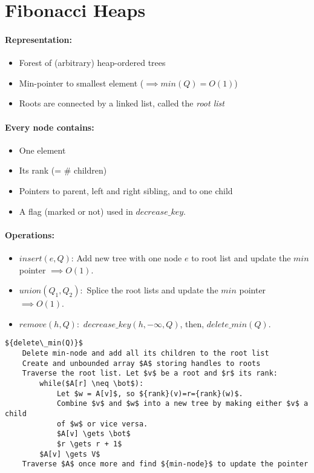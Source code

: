 \newpage \section{Fibonacci Heaps}

\paragraph{Representation:}

\begin{itemize}
\item Forest of (arbitrary) heap-ordered trees
\item Min-pointer to smallest element ($\implies {min}(Q) = O(1)$)
\item Roots are connected by a linked list, called the \emph{root list}
\end{itemize}

\paragraph{Every node contains:}

\begin{itemize}
\item One element
\item Its rank (= \# children)
\item Pointers to parent, left and right sibling, and to one child
\item A flag (marked or not) used in ${decrease\_key}$.
\end{itemize}

\paragraph{Operations:}

\begin{itemize}
\item ${insert}(e,Q)$: Add new tree with one node $e$ to root list and update the ${min}$ pointer $\implies O(1)$.
\item ${union}(Q_1, Q_2):$ Splice the root lists and update the ${min}$ pointer $\implies O(1)$.
\item ${remove}(h, Q):$ ${decrease\_key}(h, -\infty, Q)$, then, ${delete\_min}(Q)$. 
\end{itemize}

\begin{lstlisting}[mathescape]
${delete\_min(Q)}$
    Delete min-node and add all its children to the root list
    Create and unbounded array $A$ storing handles to roots
    Traverse the root list. Let $v$ be a root and $r$ its rank:
        while($A[r] \neq \bot$):
            Let $w = A[v]$, so ${rank}(v)=r={rank}(w)$.
            Combine $v$ and $w$ into a new tree by making either $v$ a child
            of $w$ or vice versa.
            $A[v] \gets \bot$
            $r \gets r + 1$
        $A[v] \gets V$
    Traverse $A$ once more and find ${min-node}$ to update the pointer
            
\end{lstlisting}


